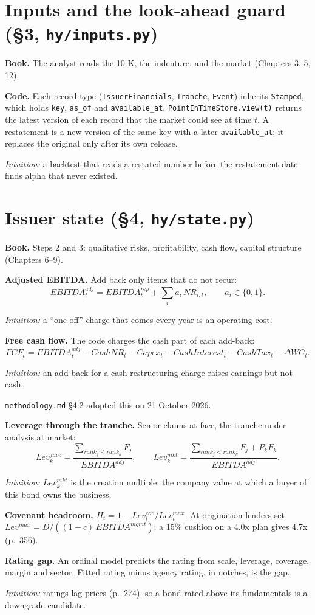 \documentclass[11pt,a4paper]{article}
\newcommand{\code}[1]{\texttt{\small #1}}
\newcommand{\why}[1]{\par\noindent\textcolor{teal!60!black}{\textit{Intuition:} #1}\par}
\begin{document}
\newpage
\section{Inputs and the look-ahead guard (\S3, \code{hy/inputs.py})}
\label{sec:inputs}
\textbf{Book.} The analyst reads the 10-K, the indenture, and the market (Chapters 3, 5, 12).

\textbf{Code.} Each record type (\code{IssuerFinancials}, \code{Tranche}, \code{Event}) inherits \code{Stamped}, which holds \code{key}, \code{as\_of} and \code{available\_at}. \code{PointInTimeStore.view(t)} returns the latest version of each record that the market could see at time $t$. A restatement is a new version of the same key with a later \code{available\_at}; it replaces the original only after its own release.
\why{a backtest that reads a restated number before the restatement date finds alpha that never existed.}

\section{Issuer state (\S4, \code{hy/state.py})}
\label{sec:state}
\textbf{Book.} Steps 2 and 3: qualitative risks, profitability, cash flow, capital structure (Chapters 6--9).

\textbf{Adjusted EBITDA.} Add back only items that do not recur:
\[ EBITDA^{adj}_t = EBITDA^{rep}_t + \textstyle\sum_i a_i\,NR_{i,t},\qquad a_i\in\{0,1\}. \]
\why{a ``one-off'' charge that comes every year is an operating cost.}

\textbf{Free cash flow.} The code charges the cash part of each add-back:
\[ FCF_t = EBITDA^{adj}_t - CashNR_t - Capex_t - CashInterest_t - CashTax_t - \Delta WC_t. \]
\why{an add-back for a cash restructuring charge raises earnings but not cash.} \code{methodology.md} \S4.2 adopted this on 21 October 2026.

\textbf{Leverage through the tranche.} Senior claims at face, the tranche under analysis at market:
\[ Lev^{face}_k=\frac{\sum_{rank_j\le rank_k}F_j}{EBITDA^{adj}},\qquad Lev^{mkt}_k=\frac{\sum_{rank_j<rank_k}F_j+P_kF_k}{EBITDA^{adj}}. \]
\why{$Lev^{mkt}_k$ is the creation multiple: the company value at which a buyer of this bond owns the business.}

\textbf{Covenant headroom.} $H_t = 1-Lev^{cov}_t/Lev^{max}_t$. At origination lenders set $Lev^{max}=D/((1-c)\,EBITDA^{mgmt})$; a 15\% cushion on a 4.0x plan gives 4.7x (p.~356).

\textbf{Rating gap.} An ordinal model predicts the rating from scale, leverage, coverage, margin and sector. Fitted rating minus agency rating, in notches, is the gap.
\why{ratings lag prices (p.~274), so a bond rated above its fundamentals is a downgrade candidate.}
\end{document}
